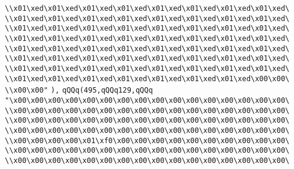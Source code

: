 \verb|\\x01\xed\x01\xed\x01\xed\x01\xed\x01\xed\x01\xed\x01\xed\x01\xed\|\newline
\verb|\\x01\xed\x01\xed\x01\xed\x01\xed\x01\xed\x01\xed\x01\xed\x01\xed\|\newline
\verb|\\x01\xed\x01\xed\x01\xed\x01\xed\x01\xed\x01\xed\x01\xed\x01\xed\|\newline
\verb|\\x01\xed\x01\xed\x01\xed\x01\xed\x01\xed\x01\xed\x01\xed\x01\xed\|\newline
\verb|\\x01\xed\x01\xed\x01\xed\x01\xed\x01\xed\x01\xed\x01\xed\x01\xed\|\newline
\verb|\\x01\xed\x01\xed\x01\xed\x01\xed\x01\xed\x01\xed\x01\xed\x01\xed\|\newline
\verb|\\x01\xed\x01\xed\x01\xed\x01\xed\x01\xed\x01\xed\x01\xed\x01\xed\|\newline
\verb|\\x01\xed\x01\xed\x01\xed\x01\xed\x01\xed\x01\xed\x01\xed\x00\x00\|\newline
\verb|\\x00\x00"|\newline
\verb|),|\newline
\verb|qQQq(495,qQQq129,qQQq|\newline
\verb|"\x00\x00\x00\x00\x00\x00\x00\x00\x00\x00\x00\x00\x00\x00\x00\x00\|\newline
\verb|\\x00\x00\x00\x00\x00\x00\x00\x00\x00\x00\x00\x00\x00\x00\x00\x00\|\newline
\verb|\\x00\x00\x00\x00\x00\x00\x00\x00\x00\x00\x00\x00\x00\x00\x00\x00\|\newline
\verb|\\x00\x00\x00\x00\x00\x00\x00\x00\x00\x00\x00\x00\x00\x00\x00\x00\|\newline
\verb|\\x00\x00\x00\x00\x01\xf0\x00\x00\x00\x00\x00\x00\x00\x00\x00\x00\|\newline
\verb|\\x00\x00\x00\x00\x00\x00\x00\x00\x00\x00\x00\x00\x00\x00\x00\x00\|\newline
\verb|\\x00\x00\x00\x00\x00\x00\x00\x00\x00\x00\x00\x00\x00\x00\x00\x00\|\newline
